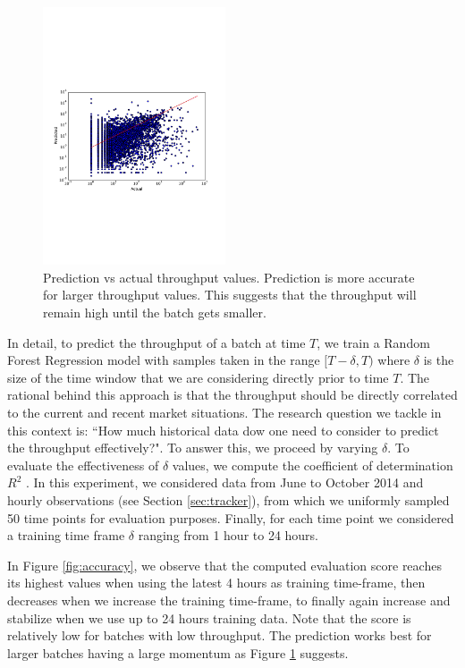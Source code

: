 \begin{figure}[tb]
	\centering
		\includegraphics[width=0.48\textwidth]{figures/predictions_3}
	\caption{Prediction vs actual throughput values. Prediction is more accurate for larger throughput values. This suggests that the throughput will remain high until the batch gets smaller.}
	\label{fig:pred}
\end{figure}

In detail, to predict the throughput of a batch at time $T$, we train a Random Forest Regression model with samples taken in the range $[T-\delta, T)$ where $\delta$ is the size of the time window that we are   considering directly prior to time $T$. The rational behind this approach is that the throughput should be directly correlated to the current and recent market situations. 
The research question we tackle in this context is: ``How much historical data dow one need to consider to predict the throughput effectively?". To answer this, we proceed by varying $\delta$.
To evaluate the effectiveness of $\delta$ values, we compute the coefficient of determination  $R^2$ \cite{sklearnweb, sklearn}.
In this experiment, we considered  data from June to October 2014 and hourly observations (see Section \ref{sec:tracker}), from which we uniformly sampled 50 time points for evaluation purposes. Finally, for each time point we considered a training time frame $\delta$ ranging from 1 hour to 24 hours. 

In Figure \ref{fig:accuracy}, we observe that the computed evaluation score reaches its highest values when using the latest 4 hours as training time-frame, then decreases when we increase the training time-frame, to finally again increase and stabilize when we use up to 24 hours training data.
Note that the score is relatively low for batches with low throughput. The prediction works best for larger batches having a large momentum as Figure \ref{fig:pred} suggests.



